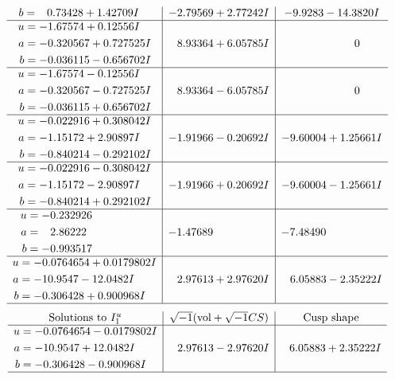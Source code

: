 \documentclass[1p]{elsarticle_modified}
\theoremstyle{definition}
\newcommand{\I}{\sqrt{-1}}
\begin{document}
$$\begin{array}{c|c|c}
\begin{aligned}
b &= \phantom{-}0.73428 + 1.42709 I\end{aligned}
 & -2.79569 + 2.77242 I & -9.9283 - 14.3820 I \\ \hline\begin{aligned}
u &= -1.67574 + 0.12556 I \\
a &= -0.320567 + 0.727525 I \\
b &= -0.036115 - 0.656702 I\end{aligned}
 & \phantom{-}8.93364 + 6.05785 I & \phantom{-0.000000 } 0 \\ \hline\begin{aligned}
u &= -1.67574 - 0.12556 I \\
a &= -0.320567 - 0.727525 I \\
b &= -0.036115 + 0.656702 I\end{aligned}
 & \phantom{-}8.93364 - 6.05785 I & \phantom{-0.000000 } 0 \\ \hline\begin{aligned}
u &= -0.022916 + 0.308042 I \\
a &= -1.15172 + 2.90897 I \\
b &= -0.840214 - 0.292102 I\end{aligned}
 & -1.91966 - 0.20692 I & -9.60004 + 1.25661 I \\ \hline\begin{aligned}
u &= -0.022916 - 0.308042 I \\
a &= -1.15172 - 2.90897 I \\
b &= -0.840214 + 0.292102 I\end{aligned}
 & -1.91966 + 0.20692 I & -9.60004 - 1.25661 I \\ \hline\begin{aligned}
u &= -0.232926\phantom{ +0.000000I} \\
a &= \phantom{-}2.86222\phantom{ +0.000000I} \\
b &= -0.993517\phantom{ +0.000000I}\end{aligned}
 & -1.47689\phantom{ +0.000000I} & -7.48490\phantom{ +0.000000I} \\ \hline\begin{aligned}
u &= -0.0764654 + 0.0179802 I \\
a &= -10.9547 - 12.0482 I \\
b &= -0.306428 + 0.900968 I\end{aligned}
 & \phantom{-}2.97613 + 2.97620 I & \phantom{-}6.05883 - 2.35222 I\\
 \hline 
 \end{array}$$\newpage$$\begin{array}{c|c|c}  
\text{Solutions to }I^u_{1}& \I (\text{vol} + \sqrt{-1}CS) & \text{Cusp shape}\\
 \hline 
\begin{aligned}
u &= -0.0764654 - 0.0179802 I \\
a &= -10.9547 + 12.0482 I \\
b &= -0.306428 - 0.900968 I\end{aligned}
 & \phantom{-}2.97613 - 2.97620 I & \phantom{-}6.05883 + 2.35222 I\\
 \hline 
 \end{array}$$\newpage\newpage\renewcommand{\arraystretch}{1}
\end{document}

